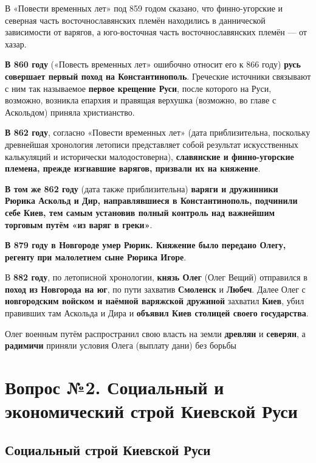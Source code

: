 \documentclass{article}
\begin{document}
В «Повести временных лет» под 859 годом сказано, что финно-угорские и северная часть восточнославянских племён находились в даннической зависимости от варягов, а юго-восточная часть восточнославянских племён — от хазар.

\hfill

\textbf{В 860 году} («Повесть временных лет» ошибочно относит его к 866 году) \textbf{русь совершает первый поход на Константинополь}. Греческие источники связывают с ним так называемое \textbf{первое крещение Руси}, после которого на Руси, возможно, возникла епархия и правящая верхушка (возможно, во главе с Аскольдом) приняла христианство.

\hfill

\textbf{В 862 году}, согласно «Повести временных лет» (дата приблизительна, поскольку древнейшая хронология летописи представляет собой результат искусственных калькуляций и исторически малодостоверна), \textbf{славянские и финно-угорские племена, прежде изгнавшие варягов, призвали их на княжение}.

\textbf{В том же 862 году} (дата также приблизительна) \textbf{варяги и дружинники Рюрика Аскольд и Дир, направлявшиеся в Константинополь, подчинили себе Киев, тем самым установив полный контроль над важнейшим торговым путём «из варяг в греки»}.

\hfill

\textbf{В 879 году в Новгороде умер Рюрик. Княжение было передано Олегу, регенту при малолетнем сыне Рюрика Игоре}. 

\hfill

В \textbf{882 году}, по летописной хронологии, \textbf{князь Олег} (Олег Вещий) отправился в \textbf{поход из Новгорода на юг}, по пути захватив \textbf{Смоленск} и \textbf{Любеч}. Далее Олег с \textbf{новгородским войском и наёмной варяжской дружиной} захватил \textbf{Киев}, убил правивших там Аскольда и Дира и \textbf{объявил Киев столицей своего государства}.

Олег военным путём распространил свою власть на земли \textbf{древлян} и \textbf{северян}, а \textbf{радимичи} приняли условия Олега (выплату дани) без борьбы

\pagebreak
\section{Вопрос №2. Социальный и экономический строй Киевской Руси}

\subsection{Социальный строй Киевской Руси}
\end{document}
